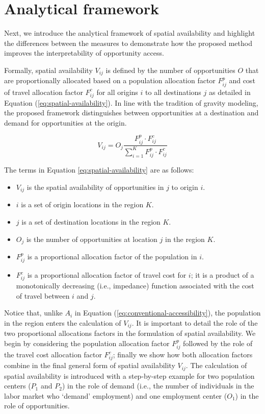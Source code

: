 \documentclass[]{elsarticle} %
\providecommand{\tightlist}{%
  \setlength{\itemsep}{0pt}\setlength{\parskip}{0pt}}
\begin{document}
\hypertarget{analytical-framework}{%
\section{Analytical framework}\label{analytical-framework}}

Next, we introduce the analytical framework of spatial availability and
highlight the differences between the measures to demonstrate how the
proposed method improves the interpretability of opportunity access.

Formally, spatial availability \(V_{ij}\) is defined by the number of
opportunities \(O\) that are proportionally allocated based on a
population allocation factor \(F^p_{ij}\) and cost of travel allocation
factor \(F^c_{ij}\) for all origins \(i\) to all destinations \(j\) as
detailed in Equation (\ref{eq:spatial-availability}). In line with the
tradition of gravity modeling, the proposed framework distinguishes
between opportunities at a destination and demand for opportunities at
the origin.

\begin{equation}
\label{eq:spatial-availability}
V_{ij} = O_j\frac{F^p_{ij} \cdot F^c_{ij}}{\sum_{i=1}^K F^p_{ij} \cdot F^c_{ij}}
\end{equation}

The terms in Equation \ref{eq:spatial-availability} are as follows:

\begin{itemize}
\tightlist
\item
  \(V_{ij}\) is the spatial availability of opportunities in \(j\) to
  origin \(i\).
\item
  \(i\) is a set of origin locations in the region \(K\).
\item
  \(j\) is a set of destination locations in the region \(K\).
\item
  \(O_j\) is the number of opportunities at location \(j\) in the region
  \(K\).
\item
  \(F^p_{ij}\) is a proportional allocation factor of the population in
  \(i\).
\item
  \(F^c_{ij}\) is a proportional allocation factor of travel cost for
  \(i\); it is a product of a monotonically decreasing (i.e., impedance)
  function associated with the cost of travel between \(i\) and \(j\).
\end{itemize}

Notice that, unlike \(A_i\) in Equation
(\ref{eq:conventional-accessibility}), the population in the region
enters the calculation of \(V_{ij}\). It is important to detail the role
of the two proportional allocations factors in the formulation of
spatial availability. We begin by considering the population allocation
factor \(F^p_{ij}\) followed by the role of the travel cost allocation
factor \(F^c_{ij}\); finally we show how both allocation factors combine
in the final general form of spatial availability \(V_{ij}\). The
calculation of spatial availability is introduced with a step-by-step
example for two population centers (\(P_1\) and \(P_2\)) in the role of
demand (i.e., the number of individuals in the labor market who `demand'
employment) and one employment center (\(O_1\)) in the role of
opportunities.
\end{document}
